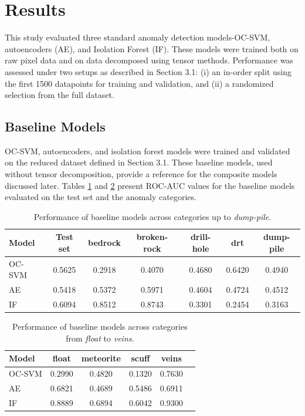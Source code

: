 \documentclass[11pt]{article}
\begin{document}
\section{Results}
\label{sec:results}

This study evaluated three standard anomaly detection models-OC-SVM, autoencoders (AE), and Isolation Forest (IF). These models were trained both on raw pixel data and on data decomposed using tensor methods. Performance was assessed under two setups as described in Section 3.1: (i) an in-order split using the first 1500 datapoints for training and validation, and (ii) a randomized selection from the full dataset.  

\subsection{Baseline Models}
OC-SVM, autoencoders, and isolation forest models were trained and validated on the reduced dataset defined in Section 3.1. These baseline models, used without tensor decomposition, provide a reference for the composite models discussed later. Tables \ref{tab:baseline_result_part1} and \ref{tab:baseline_result_part2} present ROC-AUC values for the baseline models evaluated on the test set and the anomaly categories.

\begin{table}[h!]
\centering
\begin{tabular}{lcccccc}
\hline
\textbf{Model} & \textbf{Test set} & \textbf{bedrock} & \textbf{broken-rock} & \textbf{drill-hole} & \textbf{drt} & \textbf{dump-pile} \\
\hline
OC-SVM & 0.5625 & 0.2918 & 0.4070 & 0.4680 & 0.6420 & 0.4940 \\
AE     & 0.5418 & 0.5372 & 0.5971 & 0.4604 & 0.4724 & 0.4512 \\
IF     & 0.6094 & 0.8512 & 0.8743 & 0.3301 & 0.2454 & 0.3163 \\
\hline
\end{tabular}
\caption{Performance of baseline models across categories up to \textit{dump-pile}.}
\label{tab:baseline_result_part1}
\end{table}

\begin{table}[h!]
\centering
\begin{tabular}{lccccc}
\hline
\textbf{Model} & \textbf{float} & \textbf{meteorite} & \textbf{scuff} & \textbf{veins} \\
\hline
OC-SVM & 0.2990 & 0.4820 & 0.1320 & 0.7630 \\
AE     & 0.6821 & 0.4689 & 0.5486 & 0.6911 \\
IF     & 0.8889 & 0.6894 & 0.6042 & 0.9300 \\
\hline
\end{tabular}
\caption{Performance of baseline models across categories from \textit{float} to \textit{veins}.}
\label{tab:baseline_result_part2}
\end{table}
\end{document}
